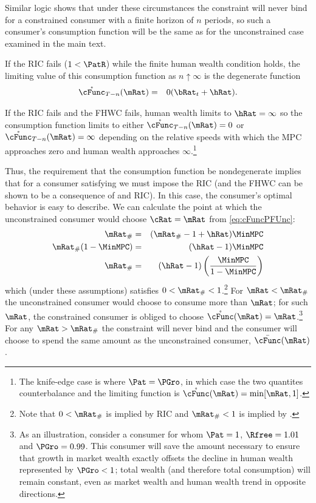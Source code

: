 \documentclass[../BufferStockTheory.tex]{subfiles}
\begin{document}
Similar logic shows that under these circumstances the constraint will
never bind for a constrained consumer with a finite horizon of $n$
periods, so such a consumer's consumption function will be the same as for the
unconstrained case examined in the main text.

If the RIC fails ($1 < \PatR$) while the finite human wealth condition
holds, the limiting value of this consumption function as $n \uparrow
\infty$ is the degenerate function
\begin{eqnarray}
  \mathring{\cFunc}_{T-n}(\mRat) & = & 0 (\bRat_{t}+\hRat).
\end{eqnarray}

If the RIC fails and the FHWC fails, human wealth limits to $\hRat =
\infty$ so the consumption function limits to either
$\mathring{\cFunc}_{T-n}(\mRat) = 0$ or
$\mathring{\cFunc}_{T-n}(\mRat) = \infty$ depending on the relative
speeds with which the MPC approaches zero and human wealth approaches
$\infty$.\footnote{The knife-edge case is where $\Pat = \PGro$, in
  which case the two quantites counterbalance and the limiting
  function is $\mathring{\cFunc}(\mRat)=\min[\mRat,1]$.}

Thus, the requirement that the consumption function be nondegenerate
implies that for a consumer satisfying  we must impose
the RIC (and the FHWC can be shown to be a consequence of  and RIC).  In
this case, the consumer's optimal behavior is easy to describe.  We
can calculate the point at which the unconstrained consumer would
choose $\cRat = \mRat$ from \eqref{eq:cFuncPFUnc}:
\begin{eqnarray}
  \mRat_{\#} & = & (\mRat_{\#}-1+\hRat)\MinMPC
\\ \mRat_{\#}(1-\MinMPC) & = & (\hRat - 1)\MinMPC
\\ \mRat_{\#} & = & (\hRat - 1)\left(\frac{\MinMPC}{1-\MinMPC}\right)
\end{eqnarray}
which (under these assumptions) satisfies $0 < \mRat_{\#} < 1$.\footnote{Note that $0 < \mRat_{\#}$ is implied by RIC and $ \mRat_{\#}<1$ is implied by \mbox{}.}  For
$\mRat < \mRat_{\#}$ the unconstrained consumer would choose to
consume more than $\mRat$; for such $\mRat$, the constrained consumer
is obliged to choose $\mathring{\cFunc}(\mRat) = \mRat$.\footnote{As an
  illustration, consider a consumer for whom $\Pat = 1$, $\Rfree
  =1.01$ and $\PGro = 0.99$.  This consumer will save the amount
  necessary to ensure that growth in market wealth exactly offsets the
  decline in human wealth represented by $\PGro < 1$; total wealth
  (and therefore total consumption) will remain constant, even as
  market wealth and human wealth trend in opposite directions.}  For
any $\mRat > \mRat_{\#}$ the constraint will never bind and the
consumer will choose to spend the same amount as the unconstrained
consumer, $\bar{\cFunc}(\mRat)$.
\end{document}
